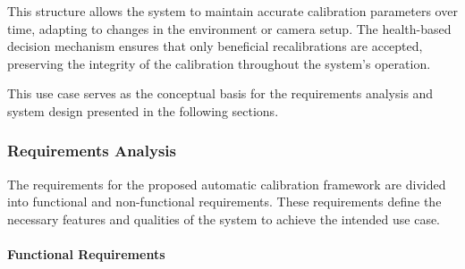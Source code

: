 \documentclass[12pt]{scrartcl}
\begin{document}
This structure allows the system to maintain accurate calibration parameters over time, adapting to changes in the environment or camera setup. The health-based decision mechanism ensures that only beneficial recalibrations are accepted, preserving the integrity of the calibration throughout the system's operation.
\newline

This use case serves as the conceptual basis for the requirements analysis and system design presented in the following sections.

\subsubsection{Requirements Analysis}

The requirements for the proposed automatic calibration framework are divided into functional and non-functional requirements. These requirements define the necessary features and qualities of the system to achieve the intended use case. 

\paragraph{Functional Requirements}
\end{document}
